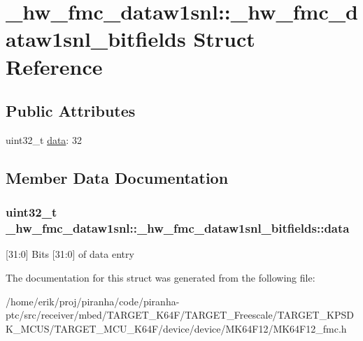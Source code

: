 \hypertarget{struct__hw__fmc__dataw1snl_1_1__hw__fmc__dataw1snl__bitfields}{}\section{\+\_\+hw\+\_\+fmc\+\_\+dataw1snl\+:\+:\+\_\+hw\+\_\+fmc\+\_\+dataw1snl\+\_\+bitfields Struct Reference}
\label{struct__hw__fmc__dataw1snl_1_1__hw__fmc__dataw1snl__bitfields}
\subsection*{Public Attributes}
\begin{DoxyCompactItemize}
\item 
uint32\+\_\+t \hyperlink{struct__hw__fmc__dataw1snl_1_1__hw__fmc__dataw1snl__bitfields_a1bda4c67e2e68efaa7d9fa282270c59f}{data}\+: 32
\end{DoxyCompactItemize}


\subsection{Member Data Documentation}
\subsubsection[{\texorpdfstring{data}{data}}]{\setlength{\rightskip}{0pt plus 5cm}uint32\+\_\+t \+\_\+hw\+\_\+fmc\+\_\+dataw1snl\+::\+\_\+hw\+\_\+fmc\+\_\+dataw1snl\+\_\+bitfields\+::data}\hypertarget{struct__hw__fmc__dataw1snl_1_1__hw__fmc__dataw1snl__bitfields_a1bda4c67e2e68efaa7d9fa282270c59f}{}\label{struct__hw__fmc__dataw1snl_1_1__hw__fmc__dataw1snl__bitfields_a1bda4c67e2e68efaa7d9fa282270c59f}
\mbox{[}31\+:0\mbox{]} Bits \mbox{[}31\+:0\mbox{]} of data entry 

The documentation for this struct was generated from the following file\+:\begin{DoxyCompactItemize}
\item 
/home/erik/proj/piranha/code/piranha-\/ptc/src/receiver/mbed/\+T\+A\+R\+G\+E\+T\+\_\+\+K64\+F/\+T\+A\+R\+G\+E\+T\+\_\+\+Freescale/\+T\+A\+R\+G\+E\+T\+\_\+\+K\+P\+S\+D\+K\+\_\+\+M\+C\+U\+S/\+T\+A\+R\+G\+E\+T\+\_\+\+M\+C\+U\+\_\+\+K64\+F/device/device/\+M\+K64\+F12/M\+K64\+F12\+\_\+fmc.\+h\end{DoxyCompactItemize}
